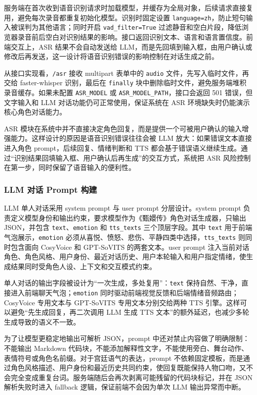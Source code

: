 \documentclass[12pt,a4paper]{article}
\begin{document}
服务端在首次收到语音识别请求时加载模型，并缓存为全局对象，后续请求直接复用，避免每次录音都重复初始化模型。识别时固定设置 \texttt{language=zh}，防止短句输入被误判为其他语言；同时开启 \texttt{vad\_filter=True} 过滤静音和空白片段，降低浏览器录音前后空白对识别结果的影响。接口返回识别文本、语言和语言置信度。前端交互上，ASR 结果不会自动发送给 LLM，而是先回填到输入框，由用户确认或修改后再发送，这一设计将语音识别错误的影响控制在对话生成之前。

从接口实现看，\texttt{/asr} 接收 multipart 表单中的 \texttt{audio} 文件，先写入临时文件，再交给 faster-whisper 识别，最后在 \texttt{finally} 块中删除临时文件，避免服务端堆积录音缓存。如果未配置 \texttt{ASR\_MODEL} 或 \texttt{ASR\_MODEL\_PATH}，接口会返回 501 错误，但文字输入和 LLM 对话功能仍可正常使用，保证系统在 ASR 环境缺失时仍能演示核心角色对话能力。

ASR 模块在系统中并不直接决定角色回复，而是提供一个可被用户确认的输入增强能力。这样设计的原因是语音识别错误往往会被 LLM 放大：如果错误文本直接进入角色 prompt，后续回复、情绪判断和 TTS 都会基于错误语义继续生成。通过“识别结果回填输入框、用户确认后再生成”的交互方式，系统把 ASR 风险控制在第一步，同时保留了语音输入的便利性。

\subsubsection{LLM 对话 Prompt 构建}

LLM 单人对话采用 system prompt 与 user prompt 分层设计。system prompt 负责定义模型身份和输出约束，要求模型作为《甄嬛传》角色对话生成器，只输出 JSON，并包含 \texttt{text}、\texttt{emotion} 和 \texttt{tts\_texts} 三个顶层字段。其中 \texttt{text} 用于前端气泡展示，\texttt{emotion} 必须从喜悦、愤怒、悲伤、平静四类中选择，\texttt{tts\_texts} 则同时包含面向 CosyVoice 和 GPT-SoVITS 的两套文本。user prompt 注入当前对话角色、角色风格、用户身份、最近对话历史、用户本轮输入和用户指定情绪，使生成结果同时受角色人设、上下文和交互模式约束。

单人对话的输出字段被设计为“一次生成，多处复用”：\texttt{text} 保持自然、干净，直接进入前端聊天气泡；\texttt{emotion} 同时驱动前端视觉反馈和后端情绪音频路由；CosyVoice 专用文本与 GPT-SoVITS 专用文本分别交给两种 TTS 引擎。这样可以避免“先生成回复，再二次调用 LLM 生成 TTS 文本”的额外延迟，也减少多轮生成导致的语义不一致。

为了让模型更稳定地输出可解析 JSON，prompt 中还对禁止内容做了明确限制：不能输出 Markdown 代码块，不能添加解释性文字，不能使用旁白、舞台动作、表情符号或角色名前缀。对于宫廷语气的表达，prompt 不依赖固定模板，而是通过角色风格描述、用户身份和最近历史共同约束，使回复既能保持人物口吻，又不会完全变成重复台词。服务端随后会再次剥离可能残留的代码块标记，并在 JSON 解析失败时进入 fallback 逻辑，保证前端不会因为单次 LLM 输出异常而中断。
\end{document}
